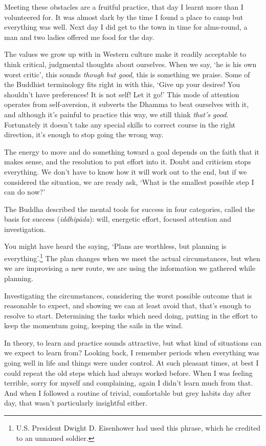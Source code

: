 Meeting these obstacles are a fruitful practice, that day I learnt more
than I volunteered for. It was almost dark by the time I found a place
to camp but everything was well. Next day I did get to the town in time
for alms-round, a man and two ladies offered me food for the day.

The values we grow up with in Western culture make it readily acceptable
to think critical, judgmental thoughts about ourselves. When we say, `he
is his own worst critic', this sounds \emph{though but good}, this is
something we praise. Some of the Buddhist terminology fits right in with
this, `Give up your desires! You shouldn't have preferences! It is not
self! Let it go!' This mode of attention operates from self-aversion, it
subverts the Dhamma to beat ourselves with it, and although it's painful
to practice this way, we still think \emph{that's good}. Fortunately it
doesn't take any special skills to correct course in the right
direction, it's enough to stop going the wrong way.


The energy to move and do something toward a goal depends on the faith
that it makes sense, and the resolution to put effort into it. Doubt and
criticism stops everything. We don't have to know how it will work out
to the end, but if we considered the situation, we are ready ask, `What
is the smallest possible step I can do now?'

The Buddha described the mental tools for success in four categories,
called the basis for success (\emph{iddhipāda}): will, energetic effort,
focused attention and investigation.

You might have heard the saying, `Plans are worthless, but planning is
everything'.\footnote{U.S. President Dwight D. Eisenhower had used this
  phrase, which he credited to an unnamed soldier.} The plan changes
when we meet the actual circumstances, but when we are improvising a new
route, we are using the information we gathered while planning.

Investigating the circumstances, considering the worst possible outcome
that is reasonable to expect, and showing we can at least avoid that,
that's enough to resolve to start. Determining the tasks which need
doing, putting in the effort to keep the momentum going, keeping the
sails in the wind.


In theory, to learn and practice sounds attractive, but what kind of
situations can we expect to learn from? Looking back, I remember periods
when everything was going well in life and things were under control. At
such pleasant times, at best I could repeat the old steps which had
always worked before. When I was feeling terrible, sorry for myself and
complaining, again I didn't learn much from that. And when I followed a
routine of trivial, comfortable but grey habits day after day, that
wasn't particularly insightful either.

